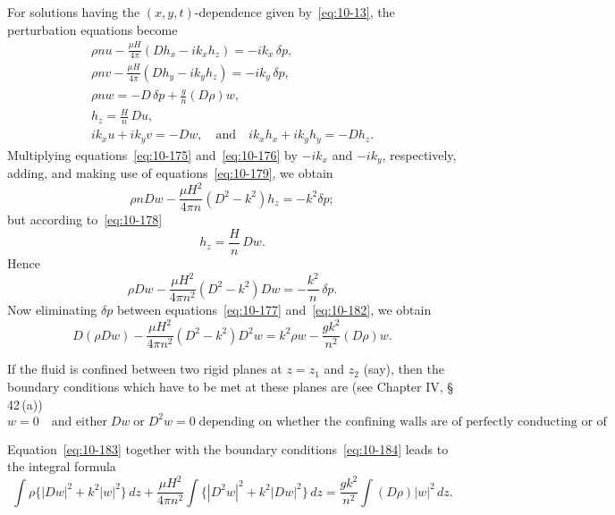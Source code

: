For solutions having the $(x,y,t)$-dependence given by~\eqref{eq:10-13}, the perturbation equations become
\begin{gather}
\rho nu - \frac{\mu H}{4\pi}(Dh_x-ik_xh_z) = -ik_x\,\delta p, \label{eq:10-175}\\
\rho nv - \frac{\mu H}{4\pi}(Dh_y-ik_yh_z) = -ik_y\,\delta p, \label{eq:10-176}\\
\rho nw = -D\,\delta p + \frac{g}{n}(D\rho)w, \label{eq:10-177}\\
h_z = \frac{H}{n}\,Du, \label{eq:10-178}\\
ik_xu+ik_yv = -Dw, \quad\text{and}\quad ik_xh_x+ik_yh_y = -Dh_z. \label{eq:10-179}
\end{gather}
Multiplying equations~\eqref{eq:10-175} and~\eqref{eq:10-176} by $-ik_x$ and $-ik_y$, respectively, adding, and making use of equations~\eqref{eq:10-179}, we obtain
\begin{equation}
\label{eq:10-180}
\rho nDw - \frac{\mu H^2}{4\pi n}(D^2-k^2)h_z = -k^2\delta p;
\end{equation}
but according to~\eqref{eq:10-178}
\begin{equation}
\label{eq:10-181}
h_z = \frac{H}{n}\,Dw.
\end{equation}
Hence
\begin{equation}
\label{eq:10-182}
\rho Dw - \frac{\mu H^2}{4\pi n^2}(D^2-k^2)Dw = -\frac{k^2}{n}\,\delta p.
\end{equation}
Now eliminating $\delta p$ between equations~\eqref{eq:10-177} and~\eqref{eq:10-182}, we obtain
\begin{equation}
\label{eq:10-183}
D(\rho Dw) - \frac{\mu H^2}{4\pi n^2}(D^2-k^2)D^2w = k^2\rho w - \frac{gk^2}{n^2}(D\rho)w.
\end{equation}

If the fluid is confined between two rigid planes at $z = z_1$ and $z_2$ (say), then the boundary conditions which have to be met at these planes are (see Chapter IV, \S\,42\,(a))
\begin{equation}
\label{eq:10-184}
w = 0 \quad\text{and either}\; Dw\;\text{or}\; D^2w = 0\;\text{depending on whether the confining walls are of perfectly conducting or of insulating material.}
\end{equation}

Equation~\eqref{eq:10-183} together with the boundary conditions~\eqref{eq:10-184} leads to the integral formula
\begin{equation}
\label{eq:10-185}
\int\rho\{|Dw|^2+k^2|w|^2\}\,dz + \frac{\mu H^2}{4\pi n^2}\int\{|D^2w|^2+k^2|Dw|^2\}\,dz = \frac{gk^2}{n^2}\int(D\rho)|w|^2\,dz.
\end{equation}

